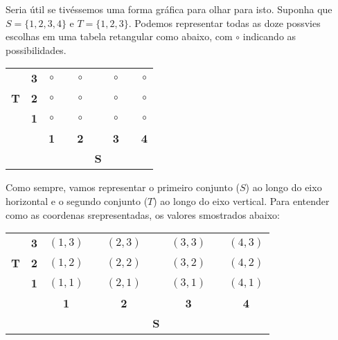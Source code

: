 Seria \'util se tiv\'essemos uma forma gr\'afica para olhar para isto. Suponha que $S=\{1,2,3,4\}$ e $T=\{1,2,3\}$. Podemos representar todas as doze poss\ih vies escolhas em uma tabela retangular como abaixo, com $\circ$ indicando as possibilidades.

\begin{table}[H]
\centering
\begin{tabular}{ccccccccc}
\multicolumn{1}{c}{       } &  \multicolumn{1}{c|}{{\bf 3}} & $\circ$ & \quad& $\circ$ &\quad & $\circ$ &\quad & $\circ$ \\
\multicolumn{1}{c}{{\bf T}} &  \multicolumn{1}{c|}{{\bf 2}} & $\circ$ & \quad& $\circ$ &\quad & $\circ$ &\quad & $\circ$ \\
\multicolumn{1}{c}{       } &  \multicolumn{1}{c|}{{\bf 1}} & $\circ$ & \quad& $\circ$ &\quad & $\circ$ &\quad & $\circ$ \\\cline{3-9}
                            &                               & {\bf 1} & \quad& {\bf 2} &\quad & {\bf 3} &\quad & {\bf 4} \\
                            &                               &         & \quad&         &{\bf S}&        &\quad &   \\
\end{tabular}
\end{table}

Como sempre, vamos representar o primeiro conjunto ($S$) ao longo do eixo horizontal e o segundo conjunto ($T$) ao longo do eixo vertical. Para entender como as coordenas s\ao representadas, os valores s\ao mostrados abaixo:

\begin{table}[H]
\centering
\begin{tabular}{ccccccccc}
\multicolumn{1}{c}{       } &  \multicolumn{1}{c|}{{\bf 3}} & $(1,3)$ & \quad& $(2,3)$ &\quad & $(3,3)$ &\quad & $(4,3)$ \\
\multicolumn{1}{c}{{\bf T}} &  \multicolumn{1}{c|}{{\bf 2}} & $(1,2)$ & \quad& $(2,2)$ &\quad & $(3,2)$ &\quad & $(4,2)$ \\
\multicolumn{1}{c}{       } &  \multicolumn{1}{c|}{{\bf 1}} & $(1,1)$ & \quad& $(2,1)$ &\quad & $(3,1)$ &\quad & $(4,1)$ \\\cline{3-9}
                            &                               & {\bf 1} & \quad& {\bf 2} &\quad & {\bf 3} &\quad & {\bf 4} \\
                            &                               &         & \quad&         &{\bf S}&        &\quad &   \\
\end{tabular}
\end{table}

